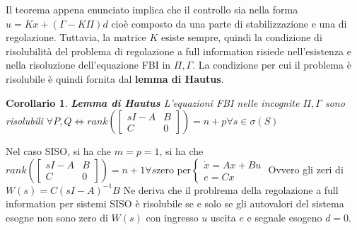 \documentclass{article}
\newtheorem{corollary}{\textbf{Corollario}}
\theoremstyle{definition}
\begin{document}
Il teorema appena enunciato implica che il controllo sia nella forma \(u=Kx+(\Gamma-K\Pi)d\) cioè composto da una parte di stabilizzazione e una di regolazione. Tuttavia, la matrice \(K\) esiste sempre, quindi la condizione di risolubilità del problema di regolazione a full information risiede nell'esistenza e nella risoluzione dell'equazione FBI in \(\Pi,\Gamma \). La condizione per cui il problema è risolubile è quindi fornita dal \textbf{lemma di Hautus}.
\begin{corollary}{\textbf{Lemma di Hautus}}
    L'equazioni FBI nelle incognite \(\Pi,\Gamma \) sono risolubili \(\forall P,Q
        \Leftrightarrow rank\left(\begin{bmatrix}
            sI-A & B \\C & 0
        \end{bmatrix}\right)=n+p \forall s\in\sigma(S)
    \)
\end{corollary}
Nel caso SISO, si ha che \(m=p=1\), si ha che \(rank\left(\begin{bmatrix}
    sI-A & B \\C & 0
\end{bmatrix}\right)=n+1 \forall s \text{zero per} \begin{cases}
    \dot{x}=Ax+Bu\\
    e=Cx
\end{cases}\)  Ovvero gli zeri di \( W(s)=C{(sI-A)}^{-1}B\)\newline
Ne deriva che il problrema della regolazione a full information per sistemi SISO è risolubile se e solo se gli autovalori del sistema esogne non sono zero di \(W(s) \) con ingresso \(u\) uscita \(e\) e segnale esogeno \(d=0\).
\end{document}
